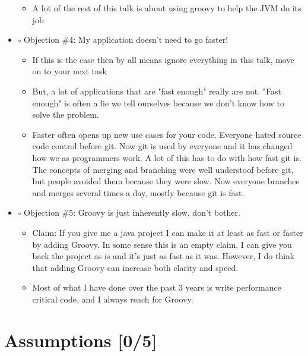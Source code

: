 \documentclass[11pt]{article}
\begin{document}
\begin{itemize}
\begin{itemize}
\item A lot of the rest of this talk is about using groovy to help the JVM do its job
\end{itemize}

\item $\square$ Objection \#4: My application doesn't need to go faster!

\begin{itemize}
\item If this is the case then by all means ignore everything in this talk, move on to your next task

\item But, a lot of applications that are "fast enough" really are not. "Fast enough" is often a lie we tell ourselves because we don't know how to solve the problem.

\item Faster often opens up new use cases for your code. Everyone hated source code control before git. Now git is used by everyone and it has changed how we as programmers work. A lot of this has to do with how fast git is. The concepts of merging and branching were well understoof before git, but people avoided them because they were slow. Now everyone branches and merges several times a day, mostly because git is fast.
\end{itemize}

\item $\square$ Objection \#5: Groovy is just inherently slow, don't bother.

\begin{itemize}
\item Claim: If you give me a java project I can make it at least as fast or faster by adding Groovy. In some sense this is an empty claim, I can give you back the project as is and it's just as fast as it was. However, I do think that adding Groovy can increase both clarity and speed.

\item Most of what I have done over the past 3 years is write performance critical code, and I always reach for Groovy.
\end{itemize}
\end{itemize}

\section{Assumptions [0/5]}
\label{sec:orgheadline2}
\end{document}

